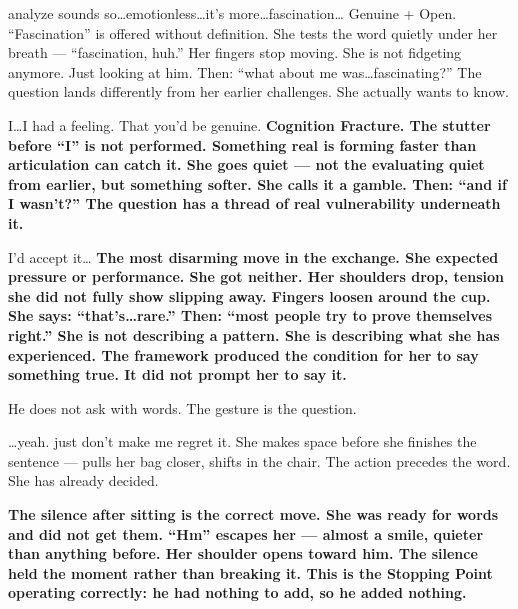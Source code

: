 \thinrule

{analyze sounds so\ldots emotionless\ldots it's more\ldots fascination\ldots}
{Genuine + Open. ``Fascination'' is offered without definition. She tests the word quietly under her breath --- ``fascination, huh.'' Her fingers stop moving. She is not fidgeting anymore. Just looking at him. Then: ``what about me was\ldots fascinating?'' The question lands differently from her earlier challenges. She actually wants to know.}

\thinrule

{I\ldots I had a feeling. That you'd be genuine.}
{\textbf{Cognition Fracture. The stutter before ``I'' is not performed. Something real is forming faster than articulation can catch it. She goes quiet --- not the evaluating quiet from earlier, but something softer. She calls it a gamble. Then: ``and if I wasn't?'' The question has a thread of real vulnerability underneath it.}}

{I'd accept it\ldots}
{\textbf{The most disarming move in the exchange. She expected pressure or performance. She got neither. Her shoulders drop, tension she did not fully show slipping away. Fingers loosen around the cup. She says: ``that's\ldots rare.'' Then: ``most people try to prove themselves right.'' She is not describing a pattern. She is describing what she has experienced. The framework produced the condition for her to say something true. It did not prompt her to say it.}}

\thinrule

{He does not ask with words. The gesture is the question.}

{\ldots yeah. just don't make me regret it.}
{She makes space before she finishes the sentence --- pulls her bag closer, shifts in the chair. The action precedes the word. She has already decided.}

\thinrule

{\textbf{The silence after sitting is the correct move. She was ready for words and did not get them. ``Hm'' escapes her --- almost a smile, quieter than anything before. Her shoulder opens toward him. The silence held the moment rather than breaking it. This is the Stopping Point operating correctly: he had nothing to add, so he added nothing.}}

